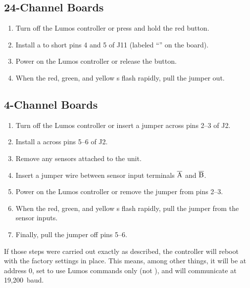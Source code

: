 \documentclass[letterpaper,twoside,onecolumn,openright,final]{memoir}
\begin{document}
\subsection{24-Channel Boards}
\begin{enumerate}
	\item	Turn off the Lumos controller or press and hold the red  button.
	\item	Install a  to short pins 4 and 5 of J11 (labeled ``''
		on the board).
	\item	Power on the Lumos controller or release the  button.
	\item	When the red, green, and yellow s flash rapidly, pull the
		jumper out.
\end{enumerate}
\subsection{4-Channel Boards}
\begin{enumerate}
	\item	Turn off the Lumos controller or insert a jumper across pins 2--3 of J2.
	\item	Install a  across pins 5--6 of J2.
	\item	Remove any sensors attached to the unit.
	\item	Insert a jumper wire between sensor input terminals $\overline{\hbox{A}}$ and $\overline{\hbox{B}}$.
	\item	Power on the Lumos controller or remove the jumper from pins 2--3.
	\item	When the red, green, and yellow s flash rapidly, pull the
		jumper from the sensor inputs.
	\item	Finally, pull the jumper off pins 5--6.
\end{enumerate}

If those steps were carried out exactly as described, %
the controller will reboot with the factory settings in place.  This means, among other things,
it will be at address 0, set to use Lumos commands only (not ), and will communicate
at 19,200~baud.
\end{document}
